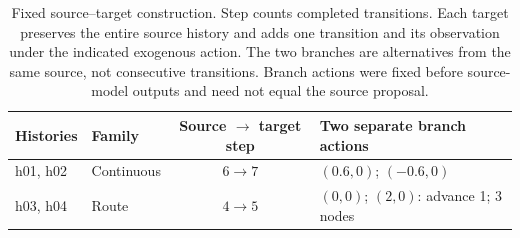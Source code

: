 \begin{table}[htbp]
\centering\small
\begin{tabular}{llcl}\toprule
Histories & Family & Source $\to$ target step & Two separate branch actions\\\midrule
h01, h02 & Continuous & $6\to7$ & $(0.6,0)$; $(-0.6,0)$\\
h03, h04 & Route & $4\to5$ & $(0,0)$; $(2,0)$: advance 1; 3 nodes\\
\bottomrule\end{tabular}
\caption{Fixed source--target construction. Step counts completed transitions.
Each target preserves the entire source history and adds one transition and
its observation under the indicated exogenous action. The two branches are
alternatives from the same source, not consecutive transitions. Branch actions
were fixed before source-model outputs and need not equal the source proposal.}
\label{tab:prospective-branches}
\end{table}

